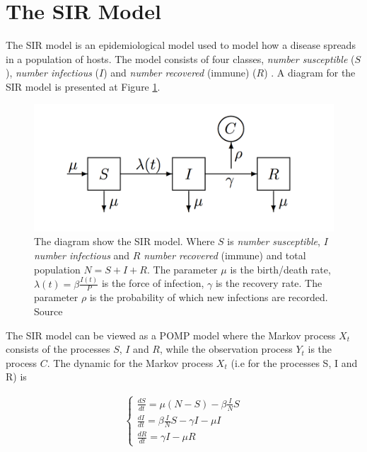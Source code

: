 \documentclass[twoside,openright]{report}
\begin{document}
\section{The SIR Model}

The SIR model is an  epidemiological model used to model how a disease spreads in a population of hosts. The model consists of four classes, \textit{number susceptible} ($S$), \textit{number infectious} ($I$) and \textit{number recovered} (immune) ($R$) . A diagram for the SIR model is presented at Figure \ref{fig:diagram_SIR_model}. \cite{king2015statistical}  

\begin{figure}[ht]
  \centering
    \includegraphics[width=1\textwidth]{./fig_sir/fig_SIR_model}
  \caption{The diagram show the SIR model. Where $S$ is \textit{number susceptible}, $I$ \textit{number infectious} and $R$ \textit{number recovered} (immune) and total population $N = S + I + R$. The parameter $\mu$ is the birth/death   rate, $\lambda (t) = \beta \frac{I(t)}{P}$ is the force of infection, $\gamma$ is the recovery rate. The parameter $\rho$ is the probability of which new infections are recorded. Source \cite{king2015statistical}}
  \label{fig:diagram_SIR_model}
\end{figure}

The SIR model can be viewed as a POMP model where the Markov process $X_t$ consists of the processes $S$, $I$ and $R$, while the observation process $Y_t$ is the process $C$. The dynamic for the Markov process $X_t$ (i.e for the processes S, I and R) is

\begin{align} \label{eq:SIR_model_X}
\begin{cases}
    \frac{dS}{ dt } = \mu (N - S) - \beta \frac{I}{N} S \\
    \frac{dI}{dt} = \beta \frac{I}{N} S - \gamma I - \mu I \\
    \frac{dR}{dt} = \gamma I - \mu R
\end{cases}
\end{align}
\end{document}
